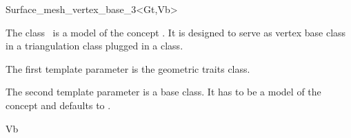 

\begin{ccRefClass}{Surface_mesh_vertex_base_3<Gt,Vb>}  %


\ccDefinition
  
The class \ccRefName\ is a model of the concept
.
It is designed to serve  as vertex base  class
in a  triangulation class  
plugged in a  
 class.


The first template parameter is the geometric traits class.

The second template parameter is a base class. It
has to be a model of the concept 
and  
defaults to .


\ccIsModel


\ccInheritsFrom 

Vb







\ccSeeAlso

 \\
 \\
 \\



\end{ccRefClass}
